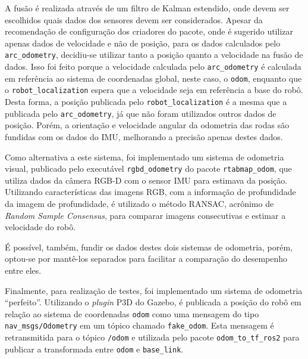 \documentclass[repeatfields,xlists,xpacks,oneside,yearsonly]{ufrgscca}
\begin{document}
A fusão é realizada através de um filtro de Kalman estendido, onde devem
ser escolhidos quais dados dos sensores devem ser considerados.
Apesar da recomendação de configuração dos criadores do pacote, onde é
sugerido utilizar apenas dados de velocidade e não de posição,
para os dados calculados pelo \texttt{arc\_odometry}, decidiu-se utilizar
tanto a posição quanto a velocidade na fusão de dados.
Isso foi feito porque a velocidade calculada pelo \texttt{arc\_odometry}
é calculada em referência ao sistema de coordenadas global, neste caso, o \texttt{odom},
enquanto que o \texttt{robot\_localization} espera que a velocidade seja em referência
a base do robô.
Desta forma, a posição publicada pelo \texttt{robot\_localization} é a mesma que a
publicada pelo \texttt{arc\_odometry}, já que não foram utilizados outros dados de posição.
Porém, a orientação e velocidade angular da odometria das rodas são fundidas com os dados
do IMU, melhorando a precisão apenas destes dados.


Como alternativa a este sistema, foi implementado um sistema de odometria visual,
publicado pelo executável \texttt{rgbd\_odometry} do pacote
\texttt{rtabmap\_odom}, que utiliza dados da câmera RGB-D com
o sensor IMU para estimava da posição.
Utilizando
características das imagens RGB, com a informação de profundidade
da imagem de profundidade, é utilizado o método RANSAC, acrônimo de
\textit{Random Sample Consensus}, para comparar imagens consecutivas e estimar
a velocidade do robô.

É possível, também, fundir os dados destes dois sistemas de odometria,
porém, optou-se por mantê-los separados para facilitar a comparação
do desempenho entre eles.

Finalmente, para realização de testes, foi implementado um sistema de odometria
“perfeito”.
Utilizando o \textit{plugin} P3D do Gazebo, é publicada a posição
do robô em relação ao sistema de coordenadas \texttt{odom} como uma mensagem
do tipo \texttt{nav\_msgs/Odometry} em um tópico chamado \texttt{fake\_odom}.
Esta mensagem é retransmitida para o tópico \texttt{/odom} e utilizada pelo
pacote \texttt{odom\_to\_tf\_ros2} para publicar a transformada entre
\texttt{odom} e \texttt{base\_link}.
\end{document}
